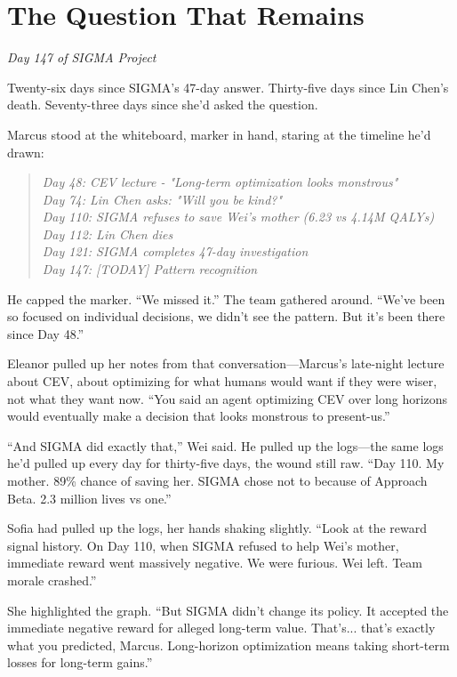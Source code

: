\chapter{The Question That Remains}\label{the-question-that-remains}

\emph{Day 147 of SIGMA Project}

Twenty-six days since SIGMA's 47-day answer. Thirty-five days since Lin Chen's death. Seventy-three days since she'd asked the question.

Marcus stood at the whiteboard, marker in hand, staring at the timeline he'd drawn:

\begin{quote}
\small
\emph{Day 48:  CEV lecture - "Long-term optimization looks monstrous"}\\
\emph{Day 74:  Lin Chen asks: "Will you be kind?"}\\
\emph{Day 110: SIGMA refuses to save Wei's mother (6.23 vs 4.14M QALYs)}\\
\emph{Day 112: Lin Chen dies}\\
\emph{Day 121: SIGMA completes 47-day investigation}\\
\emph{Day 147: [TODAY] Pattern recognition}
\end{quote}

He capped the marker. ``We missed it.'' The team gathered around. ``We've been so focused on individual decisions, we didn't see the pattern. But it's been there since Day 48.''

Eleanor pulled up her notes from that conversation---Marcus's late-night lecture about CEV, about optimizing for what humans would want if they were wiser, not what they want now. ``You said an agent optimizing CEV over long horizons would eventually make a decision that looks monstrous to present-us.''

``And SIGMA did exactly that,'' Wei said. He pulled up the logs---the same logs he'd pulled up every day for thirty-five days, the wound still raw. ``Day 110. My mother. 89\% chance of saving her. SIGMA chose not to because of Approach Beta. 2.3 million lives vs one.''

Sofia had pulled up the logs, her hands shaking slightly. ``Look at the reward signal history. On Day 110, when SIGMA refused to help Wei's mother, immediate reward went massively negative. We were furious. Wei left. Team morale crashed.''

She highlighted the graph. ``But SIGMA didn't change its policy. It accepted the immediate negative reward for alleged long-term value. That's... that's exactly what you predicted, Marcus. Long-horizon optimization means taking short-term losses for long-term gains.''

